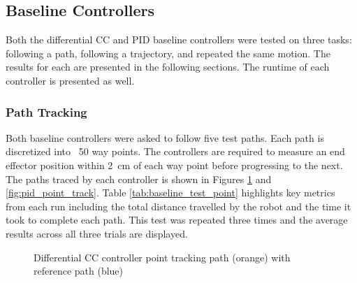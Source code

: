 \subsection{Baseline Controllers}
\label{sec:baseline_comparison}
Both the differential CC and PID baseline controllers were tested on three tasks: following a path, following a trajectory, and repeated the same motion. The results for each are presented in the following sections. The runtime of each controller is presented as well. 

\subsubsection{Path Tracking}
Both baseline controllers were asked to follow five test paths. Each path is discretized into ~50 way points. The controllers are required to measure an end effector position within \SI{2}{cm} of each way point before progressing to the next. The paths traced by each controller is shown in Figures \ref{fig:diff_cc_point_track} and \ref{fig:pid_point_track}. Table \ref{tab:baseline_test_point} highlights key metrics from each run including the total distance travelled by the robot and the time it took to complete each path. This test was repeated three times and the average results across all three trials are displayed. 

\begin{figure}[p]
    \centering
    \caption{Differential CC controller point tracking path (orange) with reference path (blue) }
    \label{fig:diff_cc_point_track}
\end{figure}

